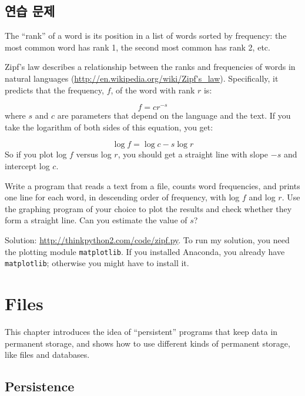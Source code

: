 \documentclass[10pt]{book}
\begin{document}
\section{연습 문제}

\begin{exercise}

The ``rank'' of a word is its position in a list of words
sorted by frequency: the most common word has rank 1, the
second most common has rank 2, etc.

Zipf's law describes a relationship between the ranks and frequencies
of words in natural languages
(\url{http://en.wikipedia.org/wiki/Zipf's_law}).  Specifically, it
predicts that the frequency, $f$, of the word with rank $r$ is:

\[ f = c r^{-s} \]
%
where $s$ and $c$ are parameters that depend on the language and the
text.  If you take the logarithm of both sides of this equation, you
get:

\[ \log f = \log c - s \log r \]
%
So if you plot log $f$ versus log $r$, you should get
a straight line with slope $-s$ and intercept log $c$.

Write a program that reads a text from a file, counts
word frequencies, and prints one line
for each word, in descending order of frequency, with
log $f$ and log $r$.  Use the graphing program of your
choice to plot the results and check whether they form
a straight line.  Can you estimate the value of $s$?

Solution: \url{http://thinkpython2.com/code/zipf.py}.
To run my solution, you need the plotting module {\tt matplotlib}.
If you installed Anaconda, you already have {\tt matplotlib};
otherwise you might have to install it.

\end{exercise}



\chapter{Files}

This chapter introduces the idea of ``persistent'' programs that
keep data in permanent storage, and shows how to use different
kinds of permanent storage, like files and databases.


\section{Persistence}
\end{document}
